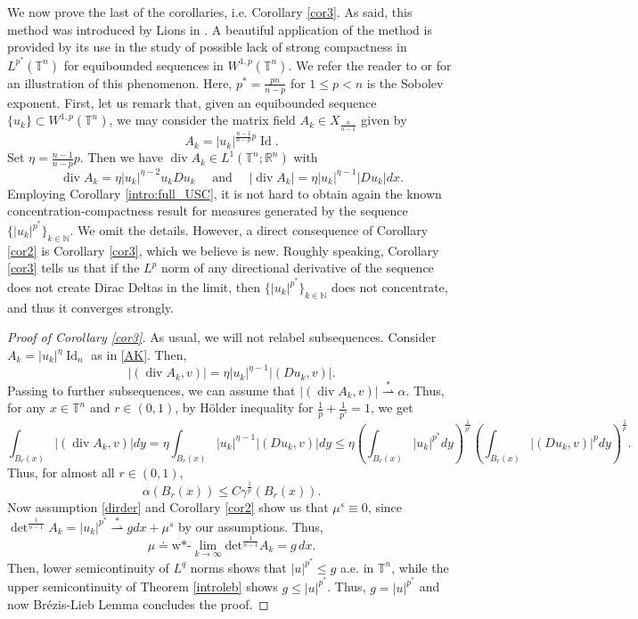 \documentclass[10pt,reqno]{amsart}
\numberwithin{equation}{section}
\newcommand{\weak}{\overset{*}{\rightharpoonup}}
\newcommand{\R}{\mathbb{R}}
\newcommand{\T}{\mathbb{T}}
\newcommand{\N}{\mathbb{N}}
\DeclareMathOperator{\Id}{Id}
\DeclareMathOperator{\dv}{div}
\theoremstyle{plain}
\theoremstyle{definition}
\theoremstyle{remark}
\begin{document}
We now  prove the last of the corollaries, i.e. Corollary \ref{cor3}. As said, this method was introduced by Lions in \cite{PLL1,PLL2,PLL3,PLL4}. A beautiful application of the method is provided by its use in the study of possible lack of strong compactness in $L^{p^*}(\T^n)$ for equibounded sequences in $W^{1,p}(\T^n)$. We refer the reader to \cite[Thm. 1.4.2]{EVAWEAK} or \cite{PLL3} for an illustration of this phenomenon. Here, $p^* = \frac{pn}{n  - p}$ for $1\le p < n$ is the Sobolev exponent. First, let us remark that, given an equibounded sequence $\{u_k\}\subset W^{1,p}(\T^n)$, we may consider the matrix field $A_k \in X_{\frac{n}{n - 1}}$ given by
\begin{equation}\label{AK}
A_k = |u_k|^{\frac{n - 1}{n - p}p}\Id.
\end{equation}
Set $\eta = \frac{n - 1}{n - p}p$. Then we have
$\dv A_k \in L^1(\T^n;\R^n)$ with
$$
\dv A_k = \eta |u_k|^{\eta - 2}u_kDu_k \quad \text{ and } \quad
 |\dv A_k| = \eta |u_k|^{\eta - 1}|Du_k| dx.
$$
Employing Corollary \ref{intro:full_USC}, it is not hard to obtain again the known concentration-compactness result for measures generated by the sequence $\{|u_k|^{p^*}\}_{k \in \N}$. We omit the details. However, a direct consequence of Corollary \ref{cor2} is Corollary \ref{cor3}, which we believe is new. Roughly speaking,  Corollary \ref{cor3} tells us that if the $L^p$ norm of any directional derivative of the sequence does not create Dirac Deltas in the limit, then $\{|u_k|^{p^*}\}_{k \in \N}$ does not concentrate, and thus it converges strongly.
\begin{proof}[Proof of Corollary \ref{cor3}]
As usual, we will not relabel subsequences. Consider $A_k =  |u_k|^{\eta}\Id_n$ as in \eqref{AK}. Then,
\[
|(\dv A_k,v)| = \eta |u_k|^{\eta - 1}|(Du_k,v)|.
\]
Passing to further subsequences, we can assume that $|(\dv A_k,v)| \weak \alpha$. Thus, for any $x \in \T^n$ and $r\in (0,1)$, by H\"older inequality for $\frac{1}{p}+\frac{1}{p'}=1$, we get 
\[
\int_{B_r(x)}|(\dv A_k,v)|dy = \eta \int_{B_r(x)} |u_k|^{\eta - 1}|(Du_k,v)|dy \le \eta\left(\int_{B_r(x)} |u_k|^{p^*}dy\right)^\frac{1}{p'}\left(\int_{B_r(x)} |(Du_k,v)|^{p}dy\right)^\frac{1}{p}.
\]
Thus, for almost all $r \in (0,1)$,
\[
\alpha(B_r(x)) \le C \gamma^{\frac{1}{p}}(B_r(x)).
\]
Now assumption \eqref{dirder} and Corollary \ref{cor2} show us that $\mu^s \equiv 0$, since $\det^{\frac{1}{n-1}} A_k=|u_k|^{p^*} \weak gdx + \mu^s $ by our assumptions. Thus, 
$$
\mu \doteq \text{w*-}\lim_{k\rightarrow \infty}\text{det}^{\frac{1}{n-1}} A_k= g\,dx.
$$
Then, lower semicontinuity of $L^q$ norms shows that $|u|^{p^*} \le g$ a.e. in $\T^n$, while the upper semicontinuity of Theorem \ref{introleb} shows $g \le |u|^{p^*}$. Thus, $g = |u|^{p^*}$ and now Br\'{e}zis-Lieb Lemma \cite{BRL} concludes the proof.
\end{proof}
\end{document}
